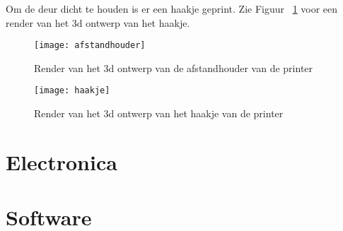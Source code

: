 Om de deur dicht te houden is er een haakje geprint. Zie Figuur
~\ref{fig:haakje} voor een render van het 3d ontwerp van het haakje.

\begin{figure}[h]
    \centering
    \begin{minipage}{0.45\textwidth}
        \centerline{\texttt{[image: afstandhouder]}}
        \caption{Render van het 3d ontwerp van de afstandhouder van de printer}
        \label{fig:afstandhouder}
    \end{minipage}\hfill
    \begin{minipage}{0.45\textwidth}
        \centerline{\texttt{[image: haakje]}}
        \caption{Render van het 3d ontwerp van het haakje van de printer}
        \label{fig:haakje}
    \end{minipage}
\end{figure}


\section{Electronica}

\section{Software}

